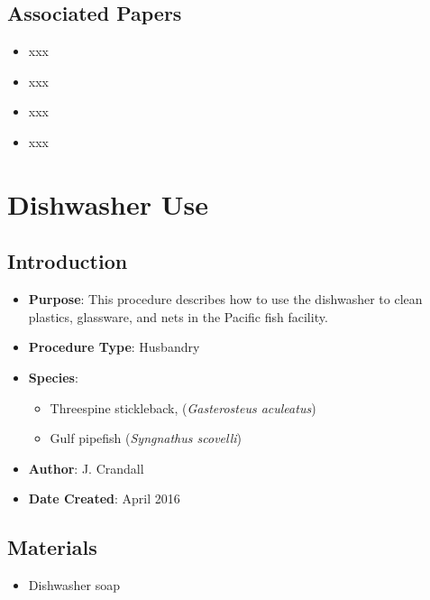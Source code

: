 \documentclass[
  letterpaper,
  DIV=11,
  numbers=noendperiod]{scrreprt}
\providecommand{\tightlist}{%
  \setlength{\itemsep}{0pt}\setlength{\parskip}{0pt}}\usepackage{longtable,booktabs,array}
\begin{document}
\hypertarget{associated-papers-12}{%
\section{Associated Papers}\label{associated-papers-12}}

\begin{itemize}
\tightlist
\item
  xxx
\item
  xxx
\item
  xxx
\item
  xxx
\end{itemize}

\hypertarget{sec-husb-dishwasher}{%
\chapter{Dishwasher Use}\label{sec-husb-dishwasher}}

\hypertarget{introduction-20}{%
\section{Introduction}\label{introduction-20}}

\begin{itemize}
\tightlist
\item
  \textbf{Purpose}: This procedure describes how to use the dishwasher
  to clean plastics, glassware, and nets in the Pacific fish facility.
\item
  \textbf{Procedure Type}: Husbandry
\item
  \textbf{Species}:

  \begin{itemize}
  \tightlist
  \item
    Threespine stickleback, (\emph{Gasterosteus aculeatus})
  \item
    Gulf pipefish (\emph{Syngnathus scovelli})
  \end{itemize}
\item
  \textbf{Author}: J. Crandall
\item
  \textbf{Date Created}: April 2016
\end{itemize}

\hypertarget{materials-18}{%
\section{Materials}\label{materials-18}}

\begin{itemize}
\tightlist
\item
  Dishwasher soap
\end{itemize}
\end{document}

